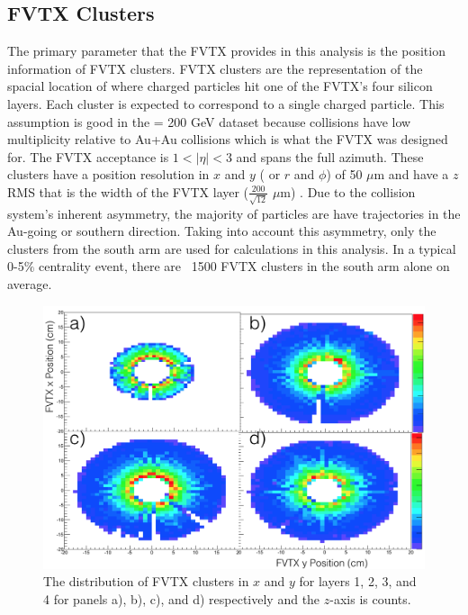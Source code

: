\subsection{FVTX Clusters}
The primary parameter that the FVTX provides in this analysis is the position information of FVTX clusters. FVTX clusters are the representation of the spacial location of where charged particles hit one of the FVTX's four silicon layers. Each cluster is expected to correspond to a single charged particle. This assumption is good in the \pau \sqsn =  200 GeV dataset because \pau collisions have low multiplicity relative to Au+Au collisions which is what the FVTX was designed for. The FVTX acceptance is $1 < | \eta | < 3$ and spans the full azimuth. These clusters have a position resolution in $x$ and $y$ ( or $r$ and $\phi$) of 50 $\mu$m  and have a $z$ RMS that is the width of the FVTX layer ($\frac{200}{\sqrt{12}}$ $\mu$m) \cite{Aidala201444}. Due to the \pau collision system's inherent asymmetry, the majority of particles are have trajectories in the Au-going or southern direction. Taking into account this asymmetry, only the clusters from the south arm are used for calculations in this analysis. In a typical 0-5$\%$ centrality event, there are ~1500 FVTX clusters in the south arm alone on average.
\begin{figure}[!h]
\begin{center}
\includegraphics[width=0.55\linewidth]{figs/fvtx_clus_xy.png}
\caption{The distribution of FVTX clusters in $x$ and $y$ for layers 1, 2, 3, and 4 for panels a), b), c), and d) respectively and the $z$-axis is counts.}
\label{fig:dc_mom_res}
\end{center}
\end{figure}

